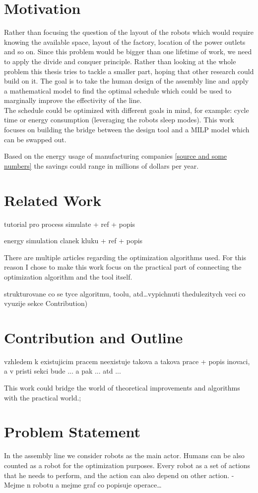 \section{Motivation}

Rather than focusing the question of the layout of the robots which would require knowing the available space, layout of the factory, location of the power outlets and so on. Since this problem would be bigger than one lifetime of work, we need to apply the divide and conquer principle. Rather than looking at the whole problem this thesis tries to tackle a smaller part, hoping that other research could build on it. The goal is to take the human design of the assembly line and apply a mathematical model to find the optimal schedule which could be used to marginally improve the effectivity of the line. \\

The schedule could be optimized with different goals in mind, for example: cycle time or energy consumption (leveraging the robots sleep modes). This work focuses on building the bridge between the design tool and a MILP model which can be swapped out. 

Based on the energy usage of manufacturing companies \ref{source and some numbers} the savings could range in millions of dollars per year.

\section{Related Work}

tutorial pro process simulate + ref + popis

energy simulation clanek kluku + ref + popis

 

There are multiple articles regarding the optimization algorithms used. For this reason I chose to make this work focus on the practical part of connecting the optimization algorithm and the tool itself.


strukturovane co se tyce algoritmu, toolu, atd\ldots vypichnuti thedulezitych veci co vyuzije sekce Contribution)

\section{Contribution and Outline}

vzhledem k existujicim pracem neexistuje takova a takova prace + popis inovaci, a v pristi sekci bude ... a pak ... atd ...

This work could bridge the world of theoretical improvements and algorithms with the practical world.; 

\section{Problem Statement}

In the assembly line we consider robots as the main actor. Humans can be also counted as a robot for the optimization purposes. Every robot as a set of actions that he needs to perform, and the action can also depend on other action. 
- Mejme n robotu a mejme graf co popisuje operace\ldots 
